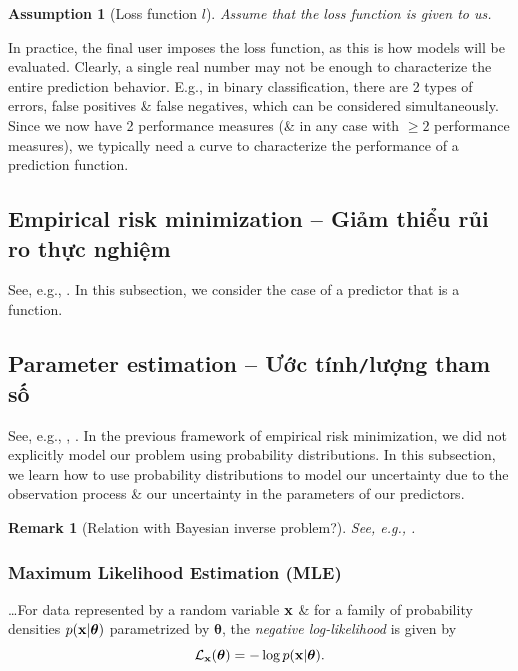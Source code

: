 \documentclass{article}
\newtheorem{assumption}{Assumption}
\newtheorem{remark}{Remark}
\begin{document}
\begin{assumption}[Loss function $l$]
	Assume that the loss function is given to us.
\end{assumption}
In practice, the final user imposes the loss function, as this is how models will be evaluated. Clearly, a single real number may not be enough to characterize the entire prediction behavior. E.g., in binary classification, there are 2 types of errors, false positives \& false negatives, which can be considered simultaneously. Since we now have 2 performance measures (\& in any case with $\ge2$ performance measures), we typically need a curve to characterize the performance of a prediction function.

\subsection{Empirical risk minimization -- Giảm thiểu rủi ro thực nghiệm}
See, e.g., \cite[Sect. 8.2: Empirical Risk Minimization]{Deisenroth_Faisal_Ong2024}. In this subsection, we consider the case of a predictor that is a function. 

\subsection{Parameter estimation -- Ước tính{\tt/}lượng tham số}
See, e.g., \cite[Sect. 8.3: Parameter Estimation]{Deisenroth_Faisal_Ong2024}, \cite{Aster_Borchers_Thurber2018}. In the previous framework of empirical risk minimization, we did not explicitly model our problem using probability distributions. In this subsection, we learn how to use probability distributions to model our uncertainty due to the observation process \& our uncertainty in the parameters of our predictors. 

\begin{remark}[Relation with Bayesian inverse problem?]
	See, e.g., \cite{Ito_Jin2015}.
\end{remark}

\subsubsection{Maximum Likelihood Estimation (MLE)}
\ldots For data represented by a random variable ${\bf x}$ \& for a family of probability densities $p({\bf x}|\boldsymbol{\theta})$ parametrized by $\boldsymbol{\theta}$, the {\it negative log-likelihood} is given by
\begin{equation}
	{\cal L}_{\bf x}(\boldsymbol{\theta}) = -\log p({\bf x}|\boldsymbol{\theta}).
\end{equation}
\end{document}
